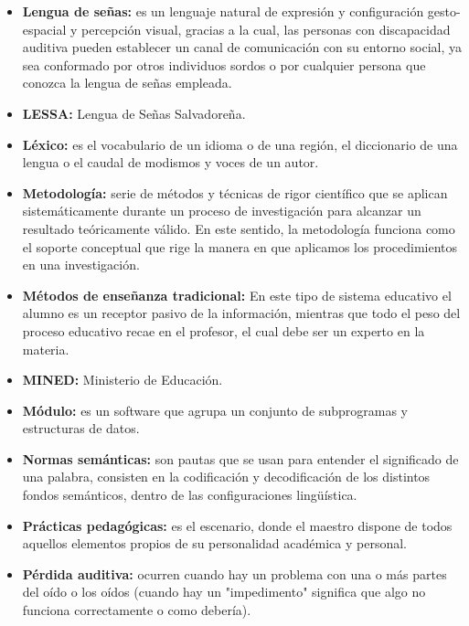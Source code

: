 \documentclass[12pt]{report}%
\begin{document}
\begin{itemize}
\item \textbf{Lengua de señas: }es un lenguaje natural de expresión y configuración gesto-espacial y percepción visual, gracias a la cual, las personas con discapacidad auditiva pueden establecer un canal de comunicación con su entorno social, ya sea conformado por otros individuos sordos o por cualquier persona que conozca la lengua de señas empleada.

\item \textbf{LESSA:} Lengua de Señas Salvadoreña.

\item \textbf{Léxico: }es el vocabulario de un idioma o de una región, el diccionario de una lengua o el caudal de modismos y voces de un autor.

\item \textbf{Metodología: }serie de métodos y técnicas de rigor científico que se aplican sistemáticamente durante un proceso de investigación para alcanzar un resultado teóricamente válido. En este sentido, la metodología funciona como el soporte conceptual que rige la manera en que aplicamos los procedimientos en una investigación.

\item \textbf{Métodos de enseñanza tradicional:} En este tipo de sistema educativo el alumno es un receptor pasivo de la información, mientras que todo el peso del proceso educativo recae en el profesor, el cual debe ser un experto en la materia.

\item \textbf{MINED:} Ministerio de Educación.

\item \textbf{Módulo:} es un software que agrupa un conjunto de subprogramas y estructuras de datos.

\item \textbf{Normas semánticas:} son pautas que se usan para entender el significado de una palabra, consisten en la codificación y decodificación de los distintos fondos semánticos, dentro de las configuraciones lingüística.

\item \textbf{Prácticas pedagógicas:} es el escenario, donde el maestro dispone de todos aquellos elementos propios de su personalidad académica y personal.

\item \textbf{Pérdida auditiva:} ocurren cuando hay un problema con una o más partes del oído o los oídos (cuando hay un "impedimento" significa que algo no funciona correctamente o como debería).


\end{itemize}
\end{document}
